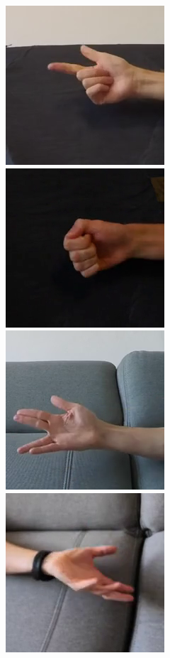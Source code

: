 \begin{figure}[!ht]
    \centerline{
        \includegraphics[scale=0.46]{figures/dataset_hand/scene003_cam2_image00025.png}
        \includegraphics[scale=0.46]{figures/dataset_hand/scene004_cam0_image00015.png}
        \includegraphics[scale=0.46]{figures/dataset_hand/scene005_cam2_image00080.png}
        \includegraphics[scale=0.46]{figures/dataset_hand/scene006_cam1_image00033.png}
}
\end{figure}
